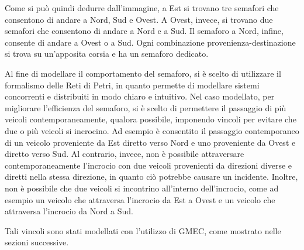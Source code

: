 Come si può quindi dedurre dall'immagine, a Est si trovano tre semafori che consentono di andare a Nord, Sud e Ovest. A Ovest, invece, si trovano due semafori che consentono di andare a Nord e a Sud. Il semaforo a Nord, infine, consente di andare a Ovest o a Sud. Ogni combinazione provenienza-destinazione si trova su un'apposita corsia e ha un semaforo dedicato.

Al fine di modellare il comportamento del semaforo, si è scelto di utilizzare il formalismo delle Reti di Petri, in quanto permette di modellare sistemi concorrenti e distribuiti in modo chiaro e intuitivo. Nel caso modellato, per migliorare l'efficienza del semaforo, si è scelto di permettere il passaggio di più veicoli contemporaneamente, qualora possibile, imponendo vincoli per evitare che due o più veicoli si incrocino. Ad esempio è consentito il passaggio contemporaneo di un veicolo proveniente da Est diretto verso Nord e uno proveniente da Ovest e diretto verso Sud. Al contrario, invece, non è possibile attraversare contemporaneamente l'incrocio con due veicoli provenienti da direzioni diverse e diretti nella stessa direzione, in quanto ciò potrebbe causare un incidente. Inoltre, non è possibile che due veicoli si incontrino all'interno dell'incrocio, come ad esempio un veicolo che attraversa l'incrocio da Est a Ovest e un veicolo che attraversa l'incrocio da Nord a Sud.

Tali vincoli sono stati modellati con l'utilizzo di GMEC, come mostrato nelle sezioni successive.